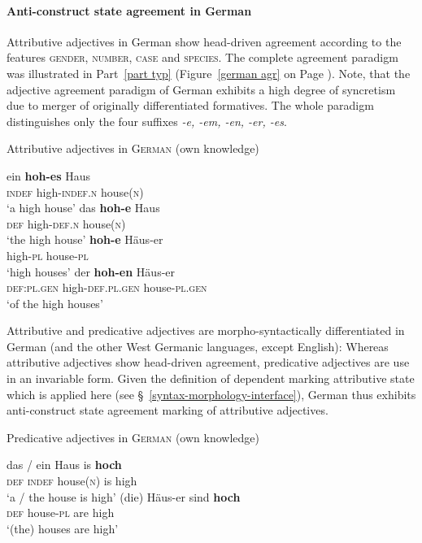 \paragraph{Anti-construct state agreement in German}
Attributive adjectives in German show head-driven agreement according to the features \textsc{gender, number, case} and \textsc{species}. The complete agreement paradigm was illustrated in Part~\ref{part typ} (Figure~\ref{german agr} on Page \pageref{german agr}). Note, that the adjective agreement paradigm of German exhibits a high degree of syncretism due to merger of originally differentiated formatives. The whole paradigm distinguishes only the four suffixes \textit{-e, -em, -en, -er, -es}.
\begin{exe}
\ex Attributive adjectives in \textsc{German} (own knowledge)
\begin{xlist}
\ex
\gll	ein \textbf{hoh-es} Haus\\
	\textsc{indef} high-\textsc{indef.n} house(\textsc{n})\\
\glt	‘a high house’
\ex	
\gll	das \textbf{hoh-e} Haus\\
	\textsc{def} high-\textsc{def.n} house(\textsc{n})\\
\glt	‘the high house’
\ex	
\gll	\textbf{hoh-e} Häus-er\\
	high-\textsc{pl} house-\textsc{pl}\\
\glt	‘high houses’
\ex	
\gll	der \textbf{hoh-en} Häus-er\\
	\textsc{def:pl.gen} high-\textsc{def.pl.gen} house-\textsc{pl.gen}\\
\glt	‘of the high houses’
\end{xlist}
\end{exe}
Attributive and predicative adjectives are morpho-syntactically differentiated in German (and the other West Germanic languages, except English): Whereas attributive adjectives show head-driven agreement, predicative adjectives are use in an invariable form. Given the definition of dependent marking attributive state which is applied here (see \S~\ref{syntax-morphology-interface}), German thus exhibits anti-construct state agreement marking of attributive adjectives.
\begin{exe}
\ex Predicative adjectives in \textsc{German} (own knowledge)
\begin{xlist}
\ex
\gll	das / ein Haus is \textbf{hoch}\\
	\textsc{def} {} \textsc{indef} house(\textsc{n}) is high\\
\glt	‘a / the house is high’
\ex	
\gll	(die) Häus-er sind \textbf{hoch}\\
	\textsc{def} house-\textsc{pl} are high\\
\glt	‘(the) houses are high’
\end{xlist}
\end{exe}

